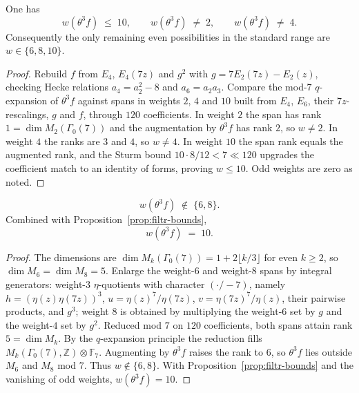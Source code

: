 \begin{proposition}\label{prop:filtr-bounds}
One has
\[
w(\theta^3 f)\;\le\;10,\qquad w(\theta^3 f)\;\neq\;2,\qquad w(\theta^3 f)\;\neq\;4.
\]
Consequently the only remaining even possibilities in the standard range are $w\in\{6,8,10\}$.
\end{proposition}
\begin{proof}
Rebuild $f$ from $E_4$, $E_4(7z)$ and $g^2$ with $g=7E_2(7z)-E_2(z)$, checking Hecke relations $a_4=a_2^2-8$ and $a_6=a_2 a_3$. Compare the mod-$7$ $q$-expansion of $\theta^3 f$ against spans in weights $2$, $4$ and $10$ built from $E_4$, $E_6$, their $7z$-rescalings, $g$ and $f$, through $120$ coefficients. In weight $2$ the span has rank $1=\dim M_2(\Gamma_0(7))$ and the augmentation by $\theta^3 f$ has rank $2$, so $w\neq2$. In weight $4$ the ranks are $3$ and $4$, so $w\neq4$. In weight $10$ the span rank equals the augmented rank, and the Sturm bound $10\cdot 8/12<7\ll120$ upgrades the coefficient match to an identity of forms, proving $w\le10$. Odd weights are zero as noted.
\end{proof}

\begin{theorem}\label{thm:filtr-10}
\[
w(\theta^3 f)\;\notin\;\{6,8\}.
\]
Combined with Proposition~\ref{prop:filtr-bounds},
\[
w(\theta^3 f)\;=\;10.
\]
\end{theorem}
\begin{proof}
The dimensions are $\dim M_k(\Gamma_0(7))=1+2\lfloor k/3\rfloor$ for even $k\ge2$, so $\dim M_6=\dim M_8=5$. Enlarge the weight-$6$ and weight-$8$ spans by integral generators: weight-$3$ $\eta$-quotients with character $(\cdot/-7)$, namely $h=(\eta(z)\eta(7z))^3$, $u=\eta(z)^7/\eta(7z)$, $v=\eta(7z)^7/\eta(z)$, their pairwise products, and $g^3$; weight $8$ is obtained by multiplying the weight-$6$ set by $g$ and the weight-$4$ set by $g^2$. Reduced mod $7$ on $120$ coefficients, both spans attain rank $5=\dim M_k$. By the $q$-expansion principle the reduction fills $M_k(\Gamma_0(7),\mathbb{Z})\otimes\mathbb{F}_7$. Augmenting by $\theta^3 f$ raises the rank to $6$, so $\theta^3 f$ lies outside $M_6$ and $M_8$ mod $7$. Thus $w\notin\{6,8\}$. With Proposition~\ref{prop:filtr-bounds} and the vanishing of odd weights, $w(\theta^3 f)=10$.
\end{proof}

